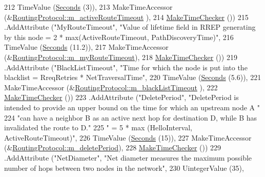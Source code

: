 \begin{DoxyCode}
212                    TimeValue (\hyperlink{group__timecivil_ga33c34b816f8ff6628e33d5c8e9713b9e}{Seconds} (3)),
213                    MakeTimeAccessor (&\hyperlink{classns3_1_1aodv_1_1RoutingProtocol_a37ec921ef1c48e4d8e7072fe989613d2}{RoutingProtocol::m\_activeRouteTimeout}
      ),
214                    \hyperlink{group__time_ga7032965bd4afa578691d88c09e4481c1}{MakeTimeChecker} ())
215     .AddAttribute (\textcolor{stringliteral}{"MyRouteTimeout"}, \textcolor{stringliteral}{"Value of lifetime field in RREP generating by this node = 2 *
       max(ActiveRouteTimeout, PathDiscoveryTime)"},
216                    TimeValue (\hyperlink{group__timecivil_ga33c34b816f8ff6628e33d5c8e9713b9e}{Seconds} (11.2)),
217                    MakeTimeAccessor (&\hyperlink{classns3_1_1aodv_1_1RoutingProtocol_a7681a59458486d0b7a61937a9a90b0a1}{RoutingProtocol::m\_myRouteTimeout}),
218                    \hyperlink{group__time_ga7032965bd4afa578691d88c09e4481c1}{MakeTimeChecker} ())
219     .AddAttribute (\textcolor{stringliteral}{"BlackListTimeout"}, \textcolor{stringliteral}{"Time for which the node is put into the blacklist = RreqRetries *
       NetTraversalTime"},
220                    TimeValue (\hyperlink{group__timecivil_ga33c34b816f8ff6628e33d5c8e9713b9e}{Seconds} (5.6)),
221                    MakeTimeAccessor (&\hyperlink{classns3_1_1aodv_1_1RoutingProtocol_a23de7759e9c26ded382a09a860b4f987}{RoutingProtocol::m\_blackListTimeout}
      ),
222                    \hyperlink{group__time_ga7032965bd4afa578691d88c09e4481c1}{MakeTimeChecker} ())
223     .AddAttribute (\textcolor{stringliteral}{"DeletePeriod"}, \textcolor{stringliteral}{"DeletePeriod is intended to provide an upper bound on the time for
       which an upstream node A "}
224                    \textcolor{stringliteral}{"can have a neighbor B as an active next hop for destination D, while B has invalidated
       the route to D."}
225                    \textcolor{stringliteral}{" = 5 * max (HelloInterval, ActiveRouteTimeout)"},
226                    TimeValue (\hyperlink{group__timecivil_ga33c34b816f8ff6628e33d5c8e9713b9e}{Seconds} (15)),
227                    MakeTimeAccessor (&\hyperlink{classns3_1_1aodv_1_1RoutingProtocol_aa337fb24748eda19dda872f172e594a3}{RoutingProtocol::m\_deletePeriod}),
228                    \hyperlink{group__time_ga7032965bd4afa578691d88c09e4481c1}{MakeTimeChecker} ())
229     .AddAttribute (\textcolor{stringliteral}{"NetDiameter"}, \textcolor{stringliteral}{"Net diameter measures the maximum possible number of hops between two
       nodes in the network"},
230                    UintegerValue (35),

\end{DoxyCode}
